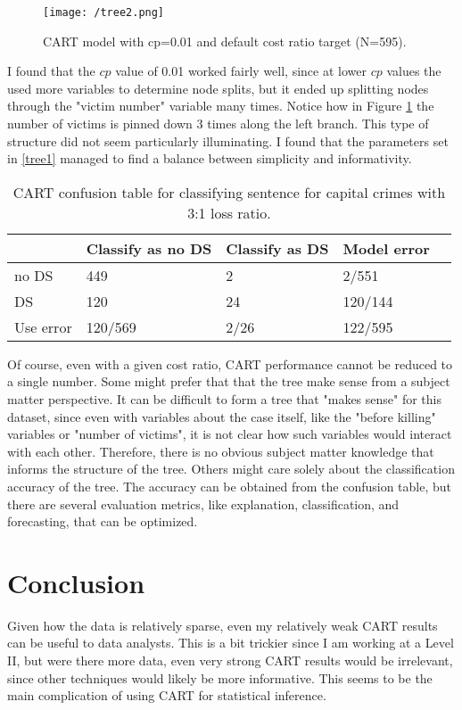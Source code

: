 \documentclass{article}
\begin{document}
\begin{figure}[!htb]
    \centering
    \texttt{[image: /tree2.png]}
    \caption{CART model with cp=0.01 and default cost ratio target (N=595).}
    \label{tree2}
\end{figure}

I found that the $cp$ value of 0.01 worked fairly well, since at lower $cp$ values the used more variables to determine node splits, but it ended up splitting nodes through the "victim number" variable many times. Notice how in Figure \ref{tree2} the number of victims is pinned down 3 times along the left branch. This type of structure did not seem particularly illuminating. I found that the parameters set in \ref{tree1} managed to find a balance between simplicity and informativity.

\begin{table}[!htb]
\centering
\label{table:tree1}
\begin{tabular}{|l|ll|ll|}
\hline
          & Classify as no DS & Classify as DS & Model error &  \\
          \hline
no DS     & 449               & 2              & 2/551       &  \\
DS        & 120               & 24             & 120/144     &  \\
\hline
Use error & 120/569           & 2/26           & 122/595     &  \\
\hline
\end{tabular}
\caption{CART confusion table for classifying sentence for capital crimes with 3:1 loss ratio.}
\end{table}

Of course, even with a given cost ratio, CART performance cannot be reduced to a single number. Some might prefer that that the tree make sense from a subject matter perspective. It can be difficult to form a tree that "makes sense" for this dataset, since even with variables about the case itself, like the "before killing" variables or "number of victims", it is not clear how such variables would interact with each other. Therefore, there is no obvious subject matter knowledge that informs the structure of the tree. Others might care solely about the classification accuracy of the tree. The accuracy can be obtained from the confusion table, but there are several evaluation metrics, like explanation, classification, and forecasting, that can be optimized. 



\section{Conclusion}
Given how the data is relatively sparse, even my relatively weak CART results can be useful to data analysts. This is a bit trickier since I am working at a Level II, but were there more data, even very strong CART results would be irrelevant, since other techniques would likely be more informative. This seems to be the main complication of using CART for statistical inference. 
\end{document}

